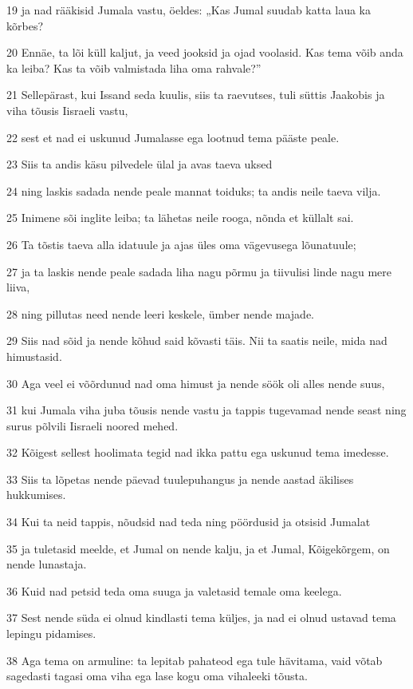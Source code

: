 \par 19 ja nad rääkisid Jumala vastu, öeldes: „Kas Jumal suudab katta laua ka kõrbes?
\par 20 Ennäe, ta lõi küll kaljut, ja veed jooksid ja ojad voolasid. Kas tema võib anda ka leiba? Kas ta võib valmistada liha oma rahvale?”
\par 21 Sellepärast, kui Issand seda kuulis, siis ta raevutses, tuli süttis Jaakobis ja viha tõusis Iisraeli vastu,
\par 22 sest et nad ei uskunud Jumalasse ega lootnud tema pääste peale.
\par 23 Siis ta andis käsu pilvedele ülal ja avas taeva uksed
\par 24 ning laskis sadada nende peale mannat toiduks; ta andis neile taeva vilja.
\par 25 Inimene sõi inglite leiba; ta lähetas neile rooga, nõnda et küllalt sai.
\par 26 Ta tõstis taeva alla idatuule ja ajas üles oma vägevusega lõunatuule;
\par 27 ja ta laskis nende peale sadada liha nagu põrmu ja tiivulisi linde nagu mere liiva,
\par 28 ning pillutas need nende leeri keskele, ümber nende majade.
\par 29 Siis nad sõid ja nende kõhud said kõvasti täis. Nii ta saatis neile, mida nad himustasid.
\par 30 Aga veel ei võõrdunud nad oma himust ja nende söök oli alles nende suus,
\par 31 kui Jumala viha juba tõusis nende vastu ja tappis tugevamad nende seast ning surus põlvili Iisraeli noored mehed.
\par 32 Kõigest sellest hoolimata tegid nad ikka pattu ega uskunud tema imedesse.
\par 33 Siis ta lõpetas nende päevad tuulepuhangus ja nende aastad äkilises hukkumises.
\par 34 Kui ta neid tappis, nõudsid nad teda ning pöördusid ja otsisid Jumalat
\par 35 ja tuletasid meelde, et Jumal on nende kalju, ja et Jumal, Kõigekõrgem, on nende lunastaja.
\par 36 Kuid nad petsid teda oma suuga ja valetasid temale oma keelega.
\par 37 Sest nende süda ei olnud kindlasti tema küljes, ja nad ei olnud ustavad tema lepingu pidamises.
\par 38 Aga tema on armuline: ta lepitab pahateod ega tule hävitama, vaid võtab sagedasti tagasi oma viha ega lase kogu oma vihaleeki tõusta.
